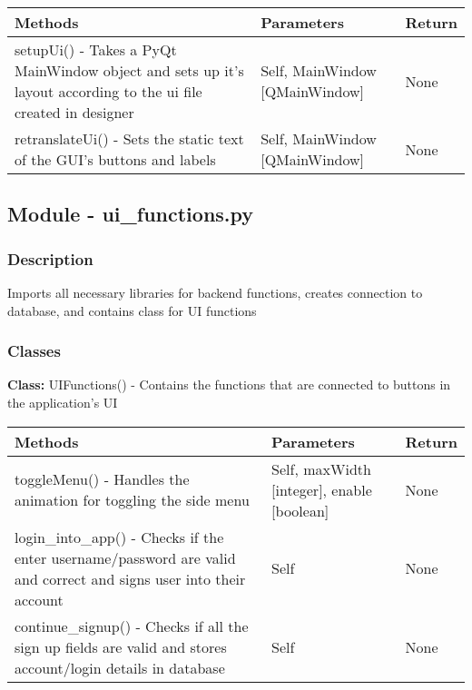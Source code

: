\documentclass[12pt, titlepage]{article}
\begin{document}
    \noindent \begin{tabular}{| p{} | p{}| p{}|}
      \hline
      \rowcolor[gray]{0.9}
      Methods & Parameters & Return\\
      \hline
      setupUi() - Takes a PyQt MainWindow object and sets up it’s layout according to the ui file created in designer &Self, MainWindow [QMainWindow] & None \\
      \hline
      retranslateUi() - Sets the static text of the GUI’s buttons and labels & Self, MainWindow [QMainWindow] & None \\
      \hline
    \end{tabular}

    \subsection{Module - ui\_functions.py}

    \subsubsection{Description}
    Imports all necessary libraries for backend functions, creates connection to database, and contains class for UI functions
    
    \subsubsection{Classes}
    \textbf{Class:} UIFunctions() - Contains the functions that are connected to buttons in the application’s UI \\
    
      \noindent \begin{tabular}{| p{} | p{}| p{}|}
        \hline
        \rowcolor[gray]{0.9}
        Methods & Parameters & Return\\
        \hline
        toggleMenu() - Handles the animation for toggling the side menu &Self, maxWidth [integer], enable [boolean] & None \\
        \hline
        login\_into\_app() - Checks if the enter username/password are valid and correct and signs user into their account & Self & None \\
        \hline
        continue\_signup() - Checks if all the sign up fields are valid and stores account/login details in database & Self & None \\
        \hline
      \end{tabular}
\end{document}
